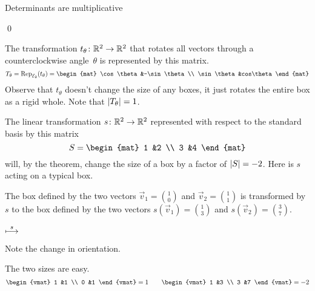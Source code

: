 \documentclass[10pt,t,serif,professionalfont]{beamer}
\begin{document}
\begin{frame}{Determinants are multiplicative}
\th[th:MatChVolByDetMat]  

\pause
\pf
{}

\pause
{}
\end{frame}
\begin{frame}
\qed
\end{frame}
\begin{frame}
\ex
The transformation $\mbox{$t_{\theta}\colon \mathbb{R}^2\to \mathbb{R}^2$}$ 
that rotates all vectors through a counterclockwise
angle~$\theta$ is represented 
by this matrix.
\begin{equation*}
  T_\theta=
  \rep{t_\theta}{\stdbasis_2}
  =
  \begin{mat}
    \cos\theta  &-\sin\theta \\
    \sin\theta  &cos\theta
  \end{mat}
\end{equation*}
Observe that $t_\theta$ doesn't change the size of any boxes, it just rotates 
the entire box as a rigid whole.
Note that $\deter{T_\theta}=1$.

\pause
\ex The linear transformation $\mbox{$s\colon \mathbb{R}^2\to \mathbb{R}^2$}$
represented with respect to the standard basis by this matrix
\begin{equation*}
  S=
  \begin{mat}
    1 &2 \\
    3 &4
  \end{mat}
\end{equation*}
will, by the theorem, change the size of a box by a factor of $\deter{S}=-2$.
Here is $s$ acting on a typical box. 
\end{frame}
\begin{frame} 
The box defined by the two vectors $\vec{v}_1=\binom{1}{0}$ and
$\vec{v}_2=\binom{1}{1}$ is transformed by~$s$ to the box defined by the 
two vectors $s(\vec{v}_1)=\binom{1}{3}$ and 
$s(\vec{v}_2)=\binom{3}{7}$. 
\begin{center}
  \quad$\stackrel{s}{\longmapsto}$\quad
\end{center}
Note the change in orientation.

\pause
The two sizes are easy.
\begin{equation*}
  \begin{vmat}
    1 &1 \\ 
    0 &1  
  \end{vmat}
  =1
  \qquad
  \begin{vmat}
    1 &3 \\ 
    3 &7  
  \end{vmat}
  =-2
\end{equation*}
\end{frame}
\end{document}
